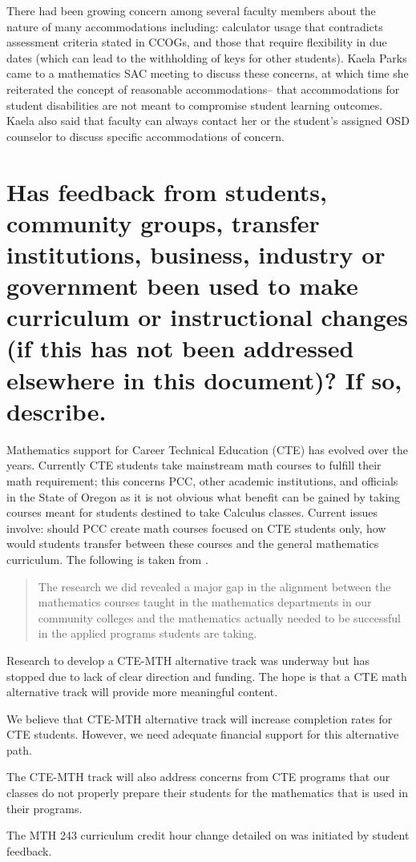 There had been growing concern among several faculty members
about the nature of many accommodations including:  calculator usage that 
contradicts assessment criteria stated in CCOGs, and  those that require flexibility 
in due dates (which can lead to the withholding of keys for other students).  Kaela Parks came to a mathematics SAC
meeting to discuss these concerns, at which time she reiterated the concept of
reasonable accommodations-- that accommodations for student disabilities are not
meant to compromise student learning outcomes. 
Kaela also said that 
faculty can always contact her or the student's assigned OSD counselor to
discuss specific accommodations of concern.

\section{Has feedback from students, community groups, transfer institutions,
business, industry or government been used to make curriculum or instructional
changes (if this has not been addressed elsewhere in this document)?  If so,
describe. }
Mathematics support for Career Technical Education (CTE) has evolved over the
years.  Currently CTE students take mainstream math courses to fulfill their
math requirement;  this concerns PCC, other academic institutions, and
officials in the State of Oregon as it is not obvious what benefit can be gained 
by taking courses meant for students destined to take Calculus classes. Current issues involve: should PCC create
math courses focused on CTE students only, how would students  transfer between
these courses and the general mathematics curriculum.   The following is taken
from \cite{natcentereduc}.
\begin{quote}
  The research we did revealed a major gap in the alignment between the
  mathematics courses taught in the mathematics departments in our community
  colleges and the mathematics actually needed to be successful in the applied
  programs students are taking. 
\end{quote}
Research to develop a CTE-MTH alternative track was underway but has stopped
due to lack of clear direction and funding.  The hope is that a CTE math
alternative track will provide more meaningful content. 

We believe that CTE-MTH alternative track will increase completion rates for
CTE students. However, we need adequate financial support for this alternative
path.

The CTE-MTH track will also address concerns from CTE programs that our classes
do not properly prepare their students for the mathematics that is used in
their programs.

The MTH 243 curriculum credit hour change detailed on  
was initiated by student feedback.
